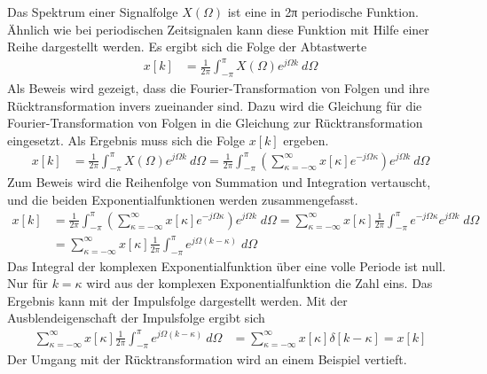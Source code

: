 Das Spektrum einer Signalfolge \(X(Ω)\) ist eine in 2π periodische Funktion. Ähnlich wie bei periodischen Zeitsignalen kann diese Funktion mit Hilfe einer Reihe dargestellt werden. Es ergibt sich die Folge der Abtastwerte
\begin{align}
x[ k] &= \frac{1}{2  \pi}  \int_{- \pi}^{\pi}{X(\Omega)  e^{j  \Omega  k}\ d\Omega} \label{eq:7.35}
\end{align}
Als Beweis wird gezeigt, dass die Fourier-Transformation von Folgen und ihre Rücktransformation invers zueinander sind. Dazu wird die Gleichung für die Fourier-Transformation von Folgen in die Gleichung zur Rücktransformation eingesetzt. Als Ergebnis muss sich die Folge \(x[k]\) ergeben.
\begin{align}
x[ k] &= \frac{1}{2  \pi}  \int_{- \pi}^{\pi}{X(\Omega)  e^{j  \Omega  k}\ d\Omega} = \frac{1}{2  \pi}  \int_{- \pi}^{\pi}{\left( \sum\limits_{\kappa = - \infty}^{\infty}{x[\kappa]  e^{- j  \Omega  \kappa}} \right)  e^{j  \Omega  k}\ d\Omega} \label{eq:7.36}
\end{align}
Zum Beweis wird die Reihenfolge von Summation und Integration vertauscht, und die beiden Exponentialfunktionen werden zusammengefasst.
\begin{align}
{x\left[k\right]} &=  {\frac{1}{2 \pi }  \int _{-\pi }^{\pi }\left(\sum\limits _{\kappa =-\infty }^{\infty }x\left[\kappa \right] e^{-j \Omega  \kappa }  \right) e^{j \Omega  k} {\; }d\Omega  =\sum\limits _{\kappa =-\infty }^{\infty }x\left[\kappa \right] \frac{1}{2 \pi }  \int _{-\pi }^{\pi }e^{-j \Omega  \kappa }  e^{j \Omega  k} {\; }d\Omega   } \\
{} &=  {\sum\limits _{\kappa =-\infty }^{\infty }x\left[\kappa \right] \frac{1}{2 \pi }  \int _{-\pi }^{\pi }e^{j \Omega  \left(k-\kappa \right)} {\; }d\Omega   }
\label{eq:7.37}
\end{align}
Das Integral der komplexen Exponentialfunktion über eine volle Periode ist null. Nur für \(k = κ\) wird aus der komplexen Exponentialfunktion die Zahl eins. Das Ergebnis kann mit der Impulsfolge dargestellt werden. Mit der Ausblendeigenschaft der Impulsfolge ergibt sich
\begin{align}
\sum\limits_{\kappa = - \infty}^{\infty}{x[\kappa]  \frac{1}{2  \pi}  \int_{- \pi}^{\pi}{e^{j  \Omega  (k - \kappa)}\ d\Omega}} &= \sum\limits_{\kappa = - \infty}^{\infty}{x[\kappa]  \delta[ k - \kappa]} = x[ k] \label{eq:7.38}
\end{align}
Der Umgang mit der Rücktransformation wird an einem Beispiel vertieft.

